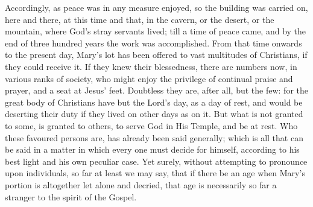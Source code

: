 Accordingly, as peace was in any measure enjoyed, so the building
was carried on, here and there, at this time and that, in the cavern,
or the desert, or the mountain, where God's stray servants lived;
till a time of peace came, and by the end of three hundred years the
work was accomplished. From that time onwards to the present day, Mary's
lot has been offered to vast multitudes of Christians, if they could
receive it. If they knew their blessedness, there are numbers now, in
various ranks of society, who might enjoy the privilege of continual
praise and prayer, and a seat at Jesus' feet. Doubtless they are,
after all, but the few: for the great body of Christians have but the
Lord's day, as a day of rest, and would be deserting their duty if
they lived on other days as on it. But what is not granted to some, is
granted to others, to serve God in His Temple, and be at rest. Who
these favoured persons are, has already been said generally; which is
all that can be said in a matter in which every one must decide for
himself, according to his best light and his own peculiar case. Yet
surely, without attempting to pronounce upon individuals, so far at
least we may say, that if there be an age when Mary's portion is
altogether let alone and decried, that age is necessarily so far a
stranger to the spirit of the Gospel.

